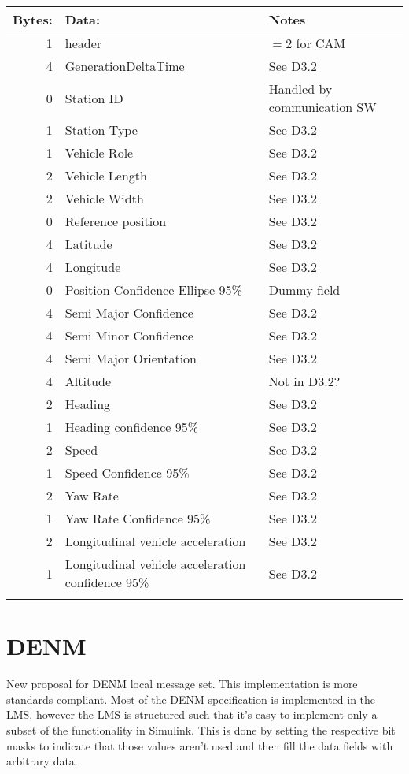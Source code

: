 \documentclass[11pt]{article}
\begin{document}
\begin{center}
\begin{tabular}{rll}
\hline
Bytes: & Data: & Notes\\
\hline
1 & header & \(=2\) for CAM\\
4 & GenerationDeltaTime & See D3.2\\
0 & Station ID & Handled by communication SW\\
1 & Station Type & See D3.2\\
1 & Vehicle Role & See D3.2\\
2 & Vehicle Length & See D3.2\\
2 & Vehicle Width & See D3.2\\
0 & Reference position & See D3.2\\
4 & Latitude & See D3.2\\
4 & Longitude & See D3.2\\
0 & Position Confidence Ellipse 95\% & Dummy field\\
4 & Semi Major Confidence & See D3.2\\
4 & Semi Minor Confidence & See D3.2\\
4 & Semi Major Orientation & See D3.2\\
4 & Altitude & Not in D3.2?\\
2 & Heading & See D3.2\\
1 & Heading confidence 95\% & See D3.2\\
2 & Speed & See D3.2\\
1 & Speed Confidence 95\% & See D3.2\\
2 & Yaw Rate & See D3.2\\
1 & Yaw Rate Confidence 95\% & See D3.2\\
2 & Longitudinal vehicle acceleration & See D3.2\\
1 & Longitudinal vehicle acceleration confidence 95\% & See D3.2\\
 &  & \\
\end{tabular}
\end{center}


\newpage
\section{DENM}
\label{sec:orgheadline3}
New proposal for DENM local message set. This implementation is more
standards compliant. Most of the DENM specification is implemented in
the LMS, however the LMS is structured such that it's easy to
implement only a subset of the functionality in Simulink. This is done
by setting the respective bit masks to indicate that those values
aren't used and then fill the data fields with arbitrary data.
\end{document}
